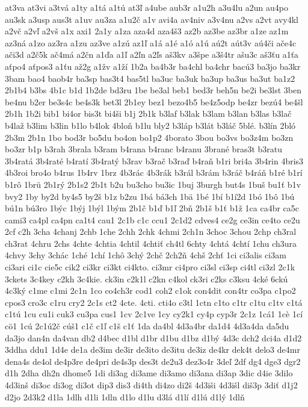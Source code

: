 {at3va
at3vi
a3tvá
a1ty
a1tá
a1tú
at3ľ
a4ube
aub3r
a1u2h
a3u4lu
a2un
au4po
au3sk
a3usp
aus3t
a1uv
au3za
a1u2č
a1v
avi4a
av4niv
a3v4nu
a2vs
a2vt
avy4kl
a2vč
a2vľ
a2vš
a1x
axi1
2a1y
a1za
aza4d
aza4š3
az2b
az3be
az3br
a1ze
az1m
az3ná
a1zo
az3ra
a1zu
az3ve
a1zú
az1ľ
a1á
a1é
a1ó
a1ú
aú2t
aút3v
aú4či
ače4c
ači3d
a2č5k
ač4má
a2čn
a1ďa
a1ľ
a2ľn
a2ľs
aš3kv
a3špe
a3š4tr
ašu3c
aš3ťu
a1ťa
aťpo4
aťpos3
a1ťu
až2g
a1žv
a1ží
1b2a
ba4b3r
ba4chl
ba4chr
bacú3
ba3jo
ba3kr
3bam
bao4
baob4r
ba3sp
bas3t4
bas5tl
ba3uc
ba3uk
ba3up
ba3us
ba3ut
ba1z2
2b1b4
b3bs
4b1c
b1d
1b2de
bd3ru
1be
be3al
beb1
bed3r
beh5n
be2i
be3lst
3ben
be4nu
b2er
be3s4c
be4s3k
bet3l
2b1ey
bez1
bezo4b5
be4z5odp
be4zr
bezú4
be4šl
2b1h
1b2i
bib1
bi4or
bis3t
bi4ši
b1j
2b1k
b3laf
b3lak
b3lam
b3lan
b3las
b3lač
b4laž
b3lim
b3lin
b1lo
b4lok
4bloň
b1lu
bly2
b3láp
b3lát
b3láč
5blé.
b3lín
2bló
2b3m
2b1n
1bo
bod3r
bo5du
bo4on
bo1p2
4borato
3bou
bo3vs
bo3z4m
bo3zn
bo3zr
b1p
b3rah
3brala
b3ram
b4rana
b4ranc
b4ranu
3brané
bras3t
b3ratu
3b4ratá
3b4raté
b4ratí
3b4ratý
b3rav
b3rač
b3raď
b4raň
b1ri
bri4a
3b4rin
4bris3
4b3roi
bro4o
b4rus
1b4rv
1brz
4b3rác
4b3rák
b3rál
b3rám
b3ráč
b4ráň
b1ré
b1rí
b1rô
1brü
2b1rý
2b1s2
2b1t
b2u
bu3cho
bu3ic
1buj
3burgh
but4s
1buš
bu1ť
b1v
bvy2
1by
by2d
by4s5
by2š
b1z
b2zu
1bá
bá3ch
1bä
1bé
1bí
b1í2d
1bó
1bô
1bú
bú1n
bú3ro
1býc
1býj
1býl
1bým
2b1č
b1ď
b1ľ
2bň
2b1š
b1ť
b1ž
1ca
ca4br
ca5c
cami3
ca4pl
ca4pn
ca1t4
cau1
2c1b
c1c
ccu1
2c1d2
cdves4
ce2g
ce3in
ce4to
ce2u
2cf
c2h
3cha
4chanj
2chb
1che
2chh
2chk
4chmi
2ch1n
3choc
3chou
2chp
ch3ral
ch3rat
4chru
2chs
4chte
4chtia
4chtil
4chtiť
ch4tl
6chty
4chtá
4chtí
1chu
ch3ura
4chvy
3chy
3chác
1ché
1chí
1chô
3chý
2chč
2ch2ň
4chš
2chť
1ci
ci3alis
ci3am
ci3ari
ci1c
cie5c
cik2
ci3kr
ci3kt
ci4kto.
ci3mr
ci4pro
ci3sl
ci3sp
ci4tl
ci3zl
2c1k
3ckets
3c4key
c2kh
3c4kie.
ck3in
c2k1l
c2kn
c4kol
ck3ri
c2ks
c3ksu
4cké
6ckú
4c3ký
c1me
c1mi
2c1n
1co
co4ch3r
cod1
coh2
c1ok
con4dit
con4tr
co3pa
c1po2
cpos3
cro3c
c1ru
cry2
2c1s
ct2
4cte.
4cti.
cti4o
c3tl
1ctn
c1to
c1tr
c1tu
c1tv
c1tá
c1tú
1cu
cu1i
cuk3
cu3pa
cus1
1cv
2c1ve
1cy
cy2k1
cy4p
cyp3r
2c1z
1cá1
1cè
1cí
cö1
1cú
2c1ú2č
cúš1
c1č
c1ľ
c1š
c1ť
1da
da4bl
4d3a4br
da1d4
4d3a4da
da5du
da3jo
dan4n
da4van
db2
d4bec
d1bl
d1br
d1bu
d1bz
d1bý
4d3c
dch2
dci4a
d1d2
3ddha
ddu1
1d4e
de1a
de3im
de3ir
de3ito
de3itu
de3iz
de4kr
dek4t
delo3
de4mr
dena4s
de4ol
de4p3re
de4pri
de4s3p
des3t
de2u3
dez3o4r
3deľ
2df
dg4
dge3
dgr2
d1h
2dha
dh2n
dhome5
1di
di3ag
di3ame
di3amo
di3ana
di3ap
3dic
d4ie
3dilo
4d3inš
di3oc
di3og
di3ot
dip3
dis3
di4th
di4zo
di2š
4d3iši
4d3išl
diš3p
3diť
d1j2
d2jo
2d3k2
d1la
1dlh
d1li
1dln
d1lo
d1lu
d3lá
d1lí
d1lú
d1lý
1dlň
}
